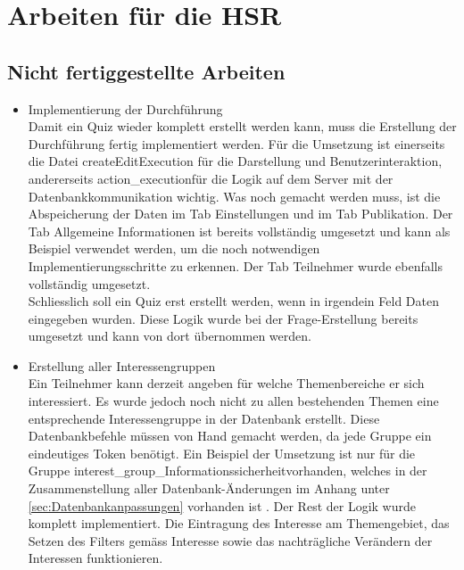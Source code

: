 


\section{Arbeiten für die HSR}
\label{sec:ArbeitenFuerDieHSR}

\subsection{Nicht fertiggestellte Arbeiten}
\label{subsec:NichtFertiggestellteArbeiten}

\begin{itemize}
	\item Implementierung der Durchführung\\
	Damit ein Quiz wieder komplett erstellt werden kann, muss die Erstellung der Durchführung fertig implementiert werden. Für die Umsetzung ist einerseits die Datei \glqq createEditExecution \grqq für die Darstellung und Benutzerinteraktion, andererseits \glqq action\_execution\grqq für die Logik auf dem Server mit der Datenbankkommunikation wichtig. Was noch gemacht werden muss, ist die Abspeicherung der Daten im Tab Einstellungen und im Tab Publikation. Der Tab Allgemeine Informationen ist bereits vollständig umgesetzt und kann als Beispiel verwendet werden, um die noch notwendigen Implementierungsschritte zu erkennen. Der Tab Teilnehmer wurde ebenfalls vollständig umgesetzt.\\
	Schliesslich soll ein Quiz erst erstellt werden, wenn in irgendein Feld Daten eingegeben wurden. Diese Logik wurde bei der Frage-Erstellung bereits umgesetzt und kann von dort übernommen werden.
	\item Erstellung aller Interessengruppen\\
	Ein Teilnehmer kann derzeit angeben für welche Themenbereiche er sich interessiert. Es wurde jedoch noch nicht zu allen bestehenden Themen eine entsprechende Interessengruppe in der Datenbank erstellt. Diese Datenbankbefehle müssen von Hand gemacht werden, da jede Gruppe ein eindeutiges Token benötigt. Ein Beispiel der Umsetzung ist nur für die Gruppe \glqq interest\_group\_Informationssicherheit\grqq vorhanden, welches in der Zusammenstellung aller Datenbank-Änderungen im Anhang unter \ref{sec:Datenbankanpassungen} vorhanden ist .
	Der Rest der Logik wurde komplett implementiert. Die Eintragung des Interesse am Themengebiet, das Setzen des Filters gemäss Interesse sowie das nachträgliche Verändern der Interessen funktionieren.
\end{itemize}

